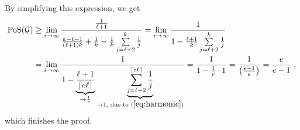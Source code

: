 By simplifying this expression, we get
\begin{align*}
    \operatorname*{PoS}(\mathcal{G})&\geq \lim\limits_{i  \rightarrow \infty} \frac{\frac{1}{\ell+1}}{ \frac{k-\ell-1}{(\ell+1)k} + \frac{1}{k} -\frac{1}{k}\sum\limits_{j=\ell+2}^{k} \frac{1}{j}} 
    = \lim\limits_{i \rightarrow \infty} \frac{1}{ 1 -\frac{\ell+1}{k} \sum\limits_{j=\ell+2}^{k} \frac{1}{j}} \\
    &=  \lim\limits_{i \rightarrow \infty} \frac{1}{ 1 -\underbrace{\frac{\ell+1}{\left\lceil e \ell\right\rceil}}_{\rightarrow \frac{1}{e}} \underbrace{\sum\limits_{j=\ell+2}^{\left\lceil e \ell\right\rceil} \frac{1}{j}}_{\rightarrow 1, \text{ due to } (\ref{eq:harmonic})}} 
    = \frac{1}{1-\frac{1}{e}\cdot 1}
    = \frac{1}{\left(\frac{e-1}{e}\right)}
    = \frac{e}{e-1}\;,
\end{align*}
which finishes the proof.